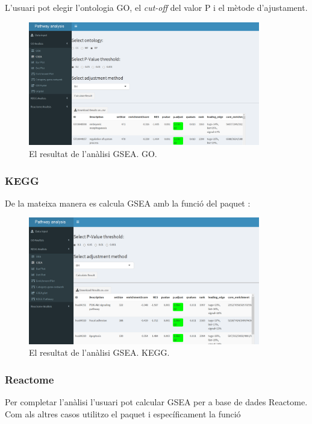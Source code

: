 \documentclass[]{article}
\begin{document}
L'usuari pot elegir l'ontologia GO, el \textit{cut-off} del valor P i el mètode d'ajustament.
\begin{figure}[H]
\centering
\includegraphics[width=0.9\textwidth]{App_F11_Items_GO_GSEA.png} 
\caption{El resultat de l'anàlisi GSEA. GO.}
\end{figure}


\subsubsection{KEGG}
De la mateixa manera es calcula GSEA amb la funció  del paquet :

\begin{figure}[H]
\centering
\includegraphics[width=0.9\textwidth]{App_F12_Items_KEGG_GSEA.png} 
\caption{El resultat de l'anàlisi GSEA. KEGG.}
\end{figure}

\subsubsection{Reactome}
Per completar l'anàlisi l'usuari pot calcular GSEA per a base de dades Reactome. Com als altres casos utilitzo el paquet  i específicament la funció 
\end{document}
